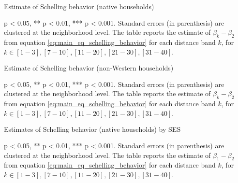 \documentclass[../main.tex]{subfiles}
\begin{document}
\begin{table}[H]
    \caption{Estimate of Schelling behavior (native households)}
    \label{tab:main_results_full}
    \centering
    \begin{threeparttable}
        
    \begin{tablenotes}[flushleft]
    \item \scriptsize * p < 0.05, ** p < 0.01, *** p < 0.001. Standard errors (in parenthesis) are clustered at the neighborhood level. The table reports the estimate of $\beta_k - \beta_2$ from equation \ref{eq:main_eq_schelling_behavior} for each distance band $k$, for $k\in {[1-3], [7-10], [11-20], [21-30], [31-40]}$. 
    \end{tablenotes}
    \end{threeparttable}
\end{table}

\begin{table}[H]
    \caption{Estimate of Schelling behavior (non-Western households)}
    \label{tab:main_results_full_non_west}
    \centering
    \begin{threeparttable}
        
    \begin{tablenotes}[flushleft]
    \item \scriptsize * p < 0.05, ** p < 0.01, *** p < 0.001. Standard errors (in parenthesis) are clustered at the neighborhood level. The table reports the estimate of $\beta_k - \beta_2$ from equation \ref{eq:main_eq_schelling_behavior} for each distance band $k$, for $k\in {[1-3], [7-10], [11-20], [21-30], [31-40]}$. 
    \end{tablenotes}
    \end{threeparttable}
\end{table}

\begin{table}[H]
    \caption{Estimates of Schelling behavior (native households) by SES}
    \label{tab:main_results_non_west_ses_full}
    \begin{adjustbox}{width = 1.2\linewidth, center}    
    \begin{threeparttable}
            
    \begin{tablenotes}[flushleft]
    \item \scriptsize * p < 0.05, ** p < 0.01, *** p < 0.001. Standard errors (in parenthesis) are clustered at the neighborhood level. The table reports the estimate of $\beta_1 - \beta_2$ from equation \ref{eq:main_eq_schelling_behavior} for each distance band $k$, for $k\in {[1-3], [7-10], [11-20], [21-30], [31-40]}$. 
    \end{tablenotes}
    \end{threeparttable}
    \end{adjustbox}
\end{table}
\end{document}
